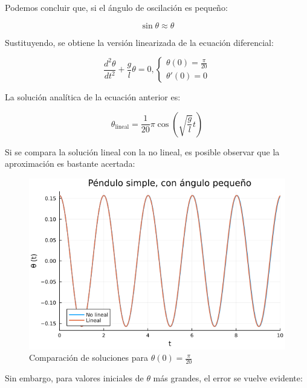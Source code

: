 \begin{ex}
\begin{solution}
        Podemos concluir que, si el ángulo de oscilación es pequeño:

        \[
            \sin \theta \approx \theta
        \]

        Sustituyendo, se obtiene la versión linearizada de la ecuación
        diferencial:

        \begin{equation*}{
                \frac{d^2 \theta}{dt^2} + \frac{g}{l} \theta = 0,
                \begin{cases}
                    \theta(0) = \frac{\pi}{20}\\
                    \theta'(0) = 0
                \end{cases}
        }\end{equation*}

        La solución analítica de la ecuación anterior es:

        \[
            \boxed{\theta_{\text{lineal}} = \frac{1}{20} \pi \cos \left( \sqrt{\frac{g}{l}} t \right)}
        \]

    \end{solution}

    Si se compara la solución lineal con la no lineal, es posible
    observar que la aproximación es bastante acertada:

    \begin{figure}[H]
        \centering
        \includegraphics[width=1.0\textwidth]{img/small.png}
        \caption{Comparación de soluciones para $\theta(0) = \frac{\pi}{20}$}
        \label{fig:pendulo_sol_small}
    \end{figure}

    Sin embargo, para valores iniciales de $\theta$ más grandes, el error se
    vuelve evidente:


\end{ex}
